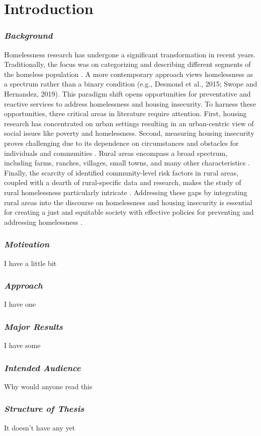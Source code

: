 \chapter{Introduction} 

\subsection{\textit{Background}}
Homelessness research has undergone a significant transformation in recent years. Traditionally, the focus was on categorizing and describing different segments of the homeless population \citep{lee_homelessness_2021}. A more contemporary approach views homelessness as a spectrum rather than a binary condition (e.g., Desmond et al., 2015; Swope and Hernandez, 2019). This paradigm shift opens opportunities for preventative and reactive services to address homelessness and housing insecurity. To harness these opportunities, three critical areas in literature require attention. First, housing research has concentrated on urban settings resulting in an urban-centric view of social issues like poverty and homelessness. Second, measuring housing insecurity proves challenging due to its dependence on circumstances and obstacles for individuals and communities \citep{leifheit_building_2022}. Rural areas encompass a broad spectrum, including farms, ranches, villages, small towns, and many other characteristics \citep{cromartie_defining_2008}. Finally, the scarcity of identified community-level risk factors in rural areas, coupled with a dearth of rural-specific data and research, makes the study of rural homelessness particularly intricate 
\citep{gleason_using_2021}. Addressing these gaps by integrating rural areas into the discourse on homelessness and housing insecurity is essential for creating a just and equitable society with effective policies for preventing and addressing homelessness \citep{oregan_how_2021-1}.


\subsection{\textit{Motivation}}
I have a little bit

\subsection{\textit{Approach}}
I have one

\subsection{\textit{Major Results}}
I have some

\subsection{\textit{Intended Audience}}
Why would anyone read this 

\subsection{\textit{Structure of Thesis}}
It doesn't have any yet
\endinput
